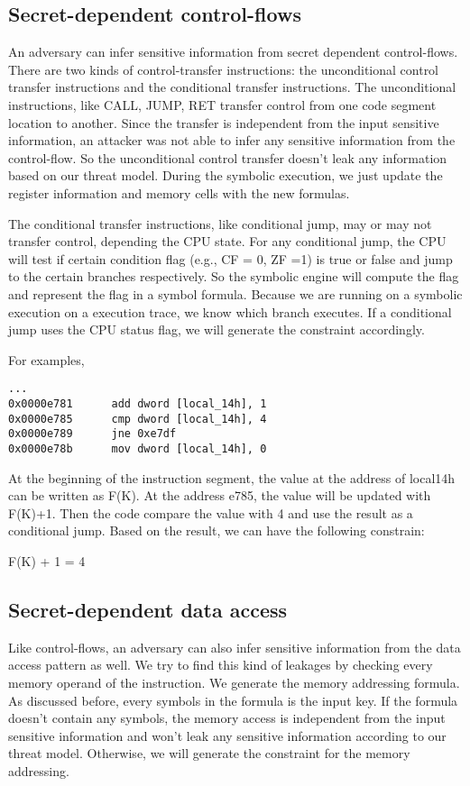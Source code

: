 \subsection{Secret-dependent control-flows}
An adversary can infer sensitive information from secret dependent control-flows. 
There are two kinds of control-transfer instructions: the unconditional control transfer instructions and the conditional transfer instructions. The unconditional instructions, like CALL, JUMP, RET transfer control from one code segment location to another. Since the transfer is independent from the input sensitive information, an attacker was not able to infer any sensitive information from the control-flow. So the unconditional control transfer doesn’t leak any information based on our threat model. During the symbolic execution, we just update the register information and memory cells with the new formulas.

The conditional transfer instructions, like conditional jump, may or may not transfer control, depending the CPU state. For any conditional jump, the CPU will test if certain condition flag (e.g., CF = 0, ZF =1) is true or false and jump to the certain branches respectively. So the symbolic engine will compute the flag and represent the flag in a symbol formula. Because we are running on a symbolic execution on a execution trace, we know which branch executes. If a conditional jump uses the CPU status flag, we will generate the constraint accordingly.

For examples,

\begin{lstlisting}
...
0x0000e781      add dword [local_14h], 1
0x0000e785      cmp dword [local_14h], 4
0x0000e789      jne 0xe7df
0x0000e78b      mov dword [local_14h], 0

\end{lstlisting}

At the beginning of the instruction segment, the value at the address of local14h can be written as F(K). At the address e785, the value will be updated with F(K)+1. Then the code compare the value with 4 and use the result as a conditional jump. Based on the result, we can have the following constrain:

F(K) + 1 = 4
 
\subsection{Secret-dependent data access}
Like control-flows, an adversary can also infer sensitive information from the data access pattern as well. We try to find this kind of leakages by checking every memory operand of the instruction. We generate the memory addressing formula. As discussed before, every symbols in the formula is the input key. If the formula doesn’t contain any symbols, the memory access is independent from the input sensitive information and won’t leak any sensitive information according to our threat model. Otherwise, we will generate the constraint for the memory addressing. 



